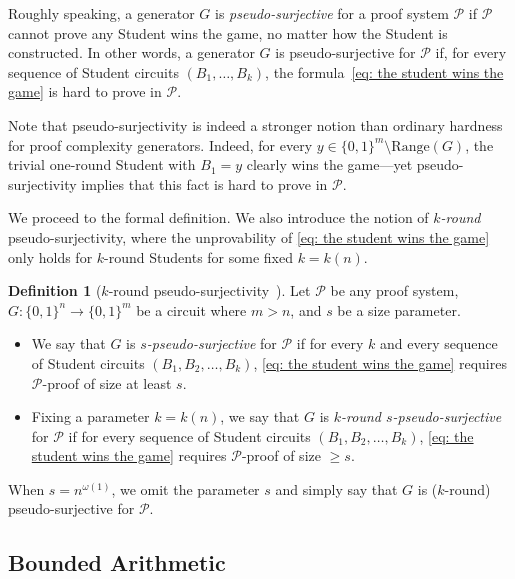 \documentclass[10pt,a4paper]{article}
\theoremstyle{definition}
\newtheorem{definition}[theorem]{Definition}
\theoremstyle{remark}
\newcommand{\calP}{\mathcal{P}}
\newcommand{\Range}{\mathrm{Range}}
\begin{document}
Roughly speaking, a generator $G$ is \emph{pseudo-surjective} for a proof system $\calP$ if $\calP$ cannot prove any Student wins the game, no matter how the Student is constructed. In other words, a generator $G$ is pseudo-surjective for $\calP$ if, for every sequence of Student circuits $(B_1, \dots, B_k)$, the formula~\eqref{eq: the student wins the game} is hard to prove in $\calP$.

Note that pseudo-surjectivity is indeed a stronger notion than ordinary hardness for proof complexity generators. Indeed, for every $y \in \{0, 1\}^m \setminus \Range(G)$, the trivial one-round Student with $B_1 = y$ clearly wins the game---yet pseudo-surjectivity implies that this fact is hard to prove in $\calP$.


We proceed to the formal definition. We also introduce the notion of \emph{$k$-round} pseudo-surjectivity, where the unprovability of \eqref{eq: the student wins the game} only holds for $k$-round Students for some fixed $k = k(n)$.

\begin{definition}[$k$-round pseudo-surjectivity~\cite{Krajicek04}]\label{def:pseudo-surjectivity}
    Let $\calP$ be any proof system, $G: \{0, 1\}^n \to \{0, 1\}^m$ be a circuit where $m > n$, and $s$ be a size parameter.\begin{itemize}
        \item We say that $G$ is \emph{$s$-pseudo-surjective} for $\calP$ if for every $k$ and every sequence of Student circuits $(B_1, B_2, \dots, B_k)$, \eqref{eq: the student wins the game} requires $\calP$-proof of size at least $s$.
        \item Fixing a parameter $k = k(n)$, we say that $G$ is \emph{$k$-round $s$-pseudo-surjective} for $\calP$ if for every sequence of Student circuits $(B_1, B_2, \dots, B_k)$, \eqref{eq: the student wins the game} requires $\calP$-proof of size $\ge s$.
    \end{itemize}
    
    When $s = n^{\omega(1)}$, we omit the parameter $s$ and simply say that $G$ is ($k$-round) pseudo-surjective for $\calP$.
\end{definition}

\subsection{Bounded Arithmetic}\label{sec: bounded arithmetic prelim}
\end{document}

